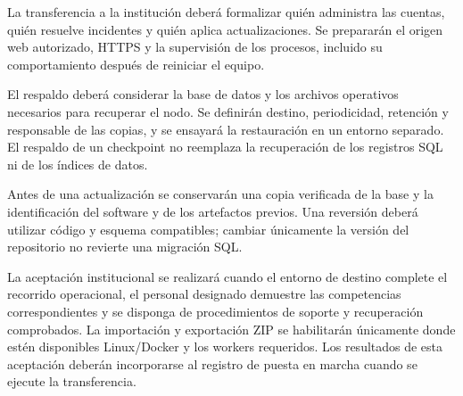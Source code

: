 La transferencia a la institución deberá formalizar quién administra las
cuentas, quién resuelve incidentes y quién aplica actualizaciones. Se
prepararán el origen web autorizado, HTTPS y la supervisión de los procesos,
incluido su comportamiento después de reiniciar el equipo.

El respaldo deberá considerar la base de datos y los archivos operativos
necesarios para recuperar el nodo. Se definirán destino, periodicidad,
retención y responsable de las copias, y se ensayará la restauración en un
entorno separado. El respaldo de un checkpoint no reemplaza la recuperación
de los registros SQL ni de los índices de datos.

Antes de una actualización se conservarán una copia verificada de la base y
la identificación del software y de los artefactos previos. Una reversión
deberá utilizar código y esquema compatibles; cambiar únicamente la versión
del repositorio no revierte una migración SQL.

La aceptación institucional se realizará cuando el entorno de destino
complete el recorrido operacional, el personal designado demuestre las
competencias correspondientes y se disponga de procedimientos de soporte y
recuperación comprobados. La importación y exportación ZIP se habilitarán
únicamente donde estén disponibles Linux/Docker y los workers requeridos.
Los resultados de esta aceptación deberán incorporarse al registro de puesta
en marcha cuando se ejecute la transferencia.
